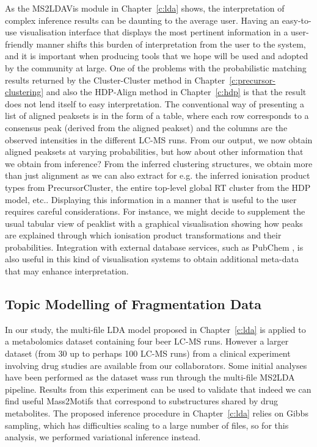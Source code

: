 As the MS2LDAVis module in Chapter~\ref{c:lda} shows, the interpretation of complex inference results can be daunting to the average user. Having an easy-to-use visualisation interface that displays the most pertinent information in a user-friendly manner shifts this burden of interpretation from the user to the system, and it is important when producing tools that we hope will be used and adopted by the community at large. One of the problems with the probabilistic matching results returned by the Cluster-Cluster method in Chapter~\ref{c:precursor-clustering} and also the HDP-Align method in Chapter~\ref{c:hdp} is that the result does not lend itself to easy interpretation. The conventional way of presenting a list of aligned peaksets is in the form of a table, where each row corresponds to a consensus peak (derived from the aligned peakset) and the columns are the observed intensities in the different LC-MS runs. From our output, we now obtain aligned peaksets at varying probabilities, but how about other information that we obtain from inference? From the inferred clustering structures, we obtain more than just alignment as we can also extract for e.g. the inferred ionisation product types from PrecursorCluster, the entire top-level global RT cluster from the HDP model, etc.. Displaying this information in a manner that is useful to the user requires careful considerations. For instance, we might decide to supplement the usual tabular view of peaklist with a graphical visualisation showing how peaks are explained through which ionisation product transformations and their probabilities. Integration with external database services, such as PubChem \cite{bolton2008pubchem}, is also useful in this kind of visualisation systems to obtain additional meta-data that may enhance interpretation. 

\subsection{Topic Modelling of Fragmentation Data}

In our study, the multi-file LDA model proposed in Chapter~\ref{c:lda} is applied to a metabolomics dataset containing four beer LC-MS runs. However a larger dataset (from 30 up to perhaps 100 LC-MS runs) from a clinical experiment involving drug studies are available from our collaborators. Some initial analyses have been performed as the dataset wass run through the multi-file MS2LDA pipeline. Results from this experiment can be used to validate that indeed we can find useful Mass2Motifs that correspond to substructures shared by drug metabolites. The proposed inference procedure in Chapter~\ref{c:lda} relies on Gibbs sampling, which has difficulties scaling to a large number of files, so for this analysis, we performed variational inference \cite{Blei2003} instead.


